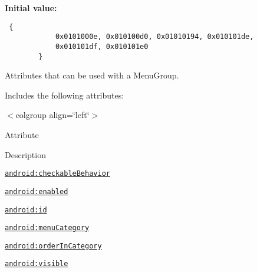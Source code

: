 \textbf{Initial value:}

\begin{Code}\begin{verbatim} {
            0x0101000e, 0x010100d0, 0x01010194, 0x010101de,
            0x010101df, 0x010101e0
        }
\end{verbatim}
\end{Code}
Attributes that can be used with a MenuGroup. 

Includes the following attributes: \begin{TabularC}{0}
\hline
\end{TabularC}
$<$colgroup align=\char`\"{}left\char`\"{}$>$ 

Attribute

Description 

{\tt \hyperlink{classandroid_1_1support_1_1v4_1_1_r_1_1styleable_126bac3dad19a00fdfbdd269f2f7d49d}{android:checkableBehavior}}

{\tt \hyperlink{classandroid_1_1support_1_1v4_1_1_r_1_1styleable_8febcff2013f06843b34c8367e07691b}{android:enabled}}

{\tt \hyperlink{classandroid_1_1support_1_1v4_1_1_r_1_1styleable_228a366c5643772debec90926b752e4b}{android:id}}

{\tt \hyperlink{classandroid_1_1support_1_1v4_1_1_r_1_1styleable_b070cff86293dacf98e20c220a8e0af0}{android:menuCategory}}

{\tt \hyperlink{classandroid_1_1support_1_1v4_1_1_r_1_1styleable_a2bd4e8b65f7ef482c13b6325dcc3878}{android:orderInCategory}}

{\tt \hyperlink{classandroid_1_1support_1_1v4_1_1_r_1_1styleable_e6b2370a519554c52dd6d1cfe33eccd4}{android:visible}}

